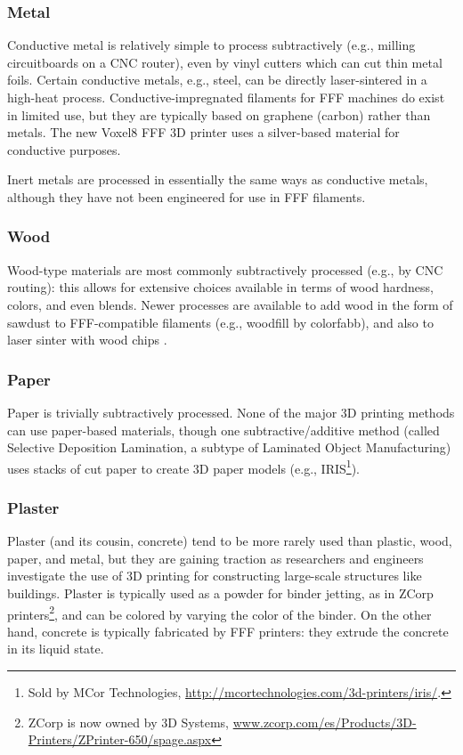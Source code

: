 \subsubsection{Metal}

Conductive metal is relatively simple to process subtractively (e.g., milling circuitboards on a CNC router), even by vinyl cutters which can cut thin metal foils. Certain conductive metals, e.g., steel, can be directly laser-sintered in a high-heat process. Conductive-impregnated filaments for FFF machines do exist in limited use, but they are typically based on graphene (carbon) rather than metals. The new Voxel8 FFF 3D printer \cite{voxel8} uses a silver-based material for conductive purposes.

Inert metals are processed in essentially the same ways as conductive metals, although they have not been engineered for use in FFF filaments.

\subsubsection{Wood}

Wood-type materials are most commonly subtractively processed (e.g., by CNC routing): this allows for extensive choices available in terms of wood hardness, colors, and even blends. Newer processes are available to add wood in the form of sawdust to FFF-compatible filaments (e.g., woodfill by colorfabb), and also to laser sinter with wood chips \cite{materialise-wood}.

\subsubsection{Paper}

Paper is trivially subtractively processed. None of the major 3D printing methods can use paper-based materials, though one subtractive/additive method (called Selective Deposition Lamination, a subtype of Laminated Object Manufacturing) uses stacks of cut paper to create 3D paper models (e.g., IRIS\footnote{Sold by MCor Technologies, \url{http://mcortechnologies.com/3d-printers/iris/}.}).

\subsubsection{Plaster}

Plaster (and its cousin, concrete) tend to be more rarely used than plastic, wood, paper, and metal, but they are gaining traction as researchers and engineers investigate the use of 3D printing for constructing large-scale structures like buildings. Plaster is typically used as a powder for binder jetting, as in ZCorp printers\footnote{ZCorp is now owned by 3D Systems, \url{www.zcorp.com/es/Products/3D-Printers/ZPrinter-650/spage.aspx}}, and can be colored by varying the color of the binder. On the other hand, concrete is typically fabricated by FFF printers: they extrude the concrete in its liquid state.

